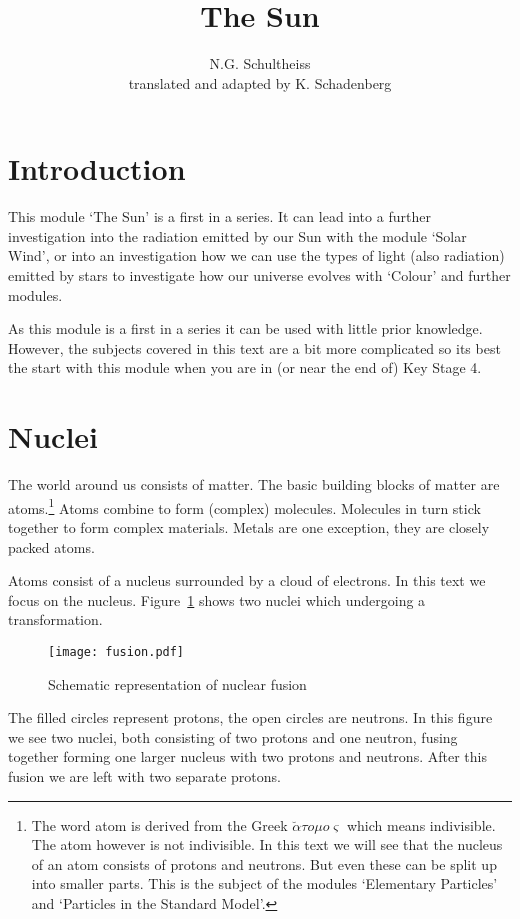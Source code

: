 


\author{N.G. Schultheiss \\ translated and adapted by K. Schadenberg}
\date{}
\title{The Sun}



\maketitle

\section{Introduction}
This module `The Sun' is a first in a series. It can lead into a further investigation into the radiation emitted by our Sun with the module `Solar Wind', or into an investigation how we can use the types of light (also radiation) emitted by stars to investigate how our universe evolves with `Colour' and further modules.

As this module is a first in a series it can be used with little prior knowledge. However, the subjects covered in this text are a bit more complicated so its best the start with this module when you are in (or near the end of) Key Stage 4.

\section{Nuclei}
The world around us consists of matter. The basic building blocks of matter are atoms.\footnote{The word atom is derived from the Greek $\breve{\alpha}\tau o \mu o \varsigma$ which means indivisible. The atom however is not indivisible. In this text we will see that the nucleus of an atom consists of protons and neutrons. But even these can be split up into smaller parts. This is the subject of the modules `Elementary Particles' and `Particles in the Standard Model'.} Atoms combine to form (complex) molecules. Molecules in turn stick together to form complex materials. Metals are one exception, they are closely packed atoms.

Atoms consist of a nucleus surrounded by a cloud of electrons. In this text we focus on the nucleus. Figure~\ref{fig:fusion_schem} shows two nuclei which undergoing a transformation.
\begin{figure}\begin{center}
\texttt{[image: fusion.pdf]}%
\caption{Schematic representation of nuclear fusion}\label{fig:fusion_schem}
\end{center}\end{figure}
The filled circles represent protons, the open circles are neutrons. In this figure we see two nuclei, both consisting of two protons and one neutron, fusing together forming one larger nucleus with two protons and neutrons. After this fusion we are left with two separate protons.

